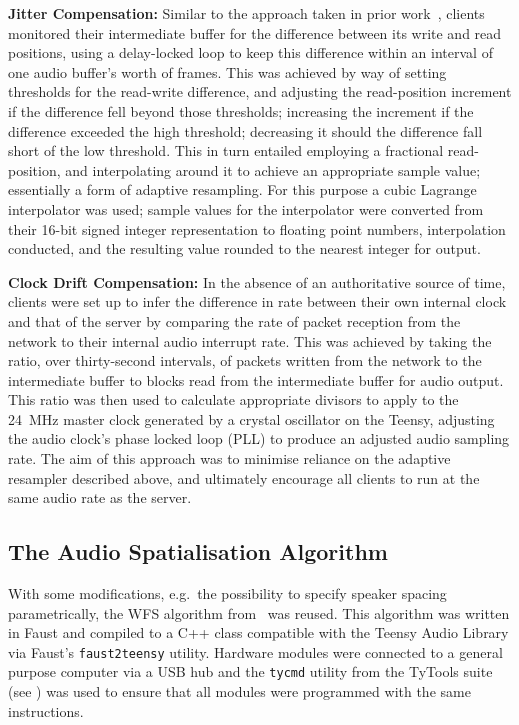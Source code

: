 \textbf{Jitter Compensation:}
Similar to the approach taken in prior
work~\citep{rushton_microcontroller-based_2023}, clients monitored their
intermediate buffer for the difference between its write and read positions,
using a delay-locked loop to keep this difference within an interval of
one audio buffer's worth of frames.
This was achieved by way of setting thresholds for the read-write difference,
and adjusting the read-position increment if the difference fell beyond those
thresholds;
increasing the increment if the difference exceeded the high threshold;
decreasing it should the difference fall short of the low threshold.
This in turn entailed employing a fractional read-position, and interpolating
around it to achieve an appropriate sample value; essentially a form of adaptive
resampling.
For this purpose a cubic Lagrange interpolator was used; sample values for the
interpolator were converted from their 16-bit signed integer representation
to floating point numbers, interpolation conducted, and the resulting value
rounded to the nearest integer for output.

\textbf{Clock Drift Compensation:}
In the absence of an authoritative source of time, clients were set up to infer
the difference in rate between their own internal clock and that of the server
by comparing the rate of packet reception from the network to their internal
audio interrupt rate.
This was achieved by taking the ratio, over thirty-second intervals, of
packets written from the network to the intermediate buffer to blocks read
from the intermediate buffer for audio output.
This ratio was then used to calculate appropriate divisors to apply to the
\qty{24}{\MHz} master clock generated by a crystal oscillator on the Teensy,
adjusting the audio clock's phase locked loop (PLL) to produce an adjusted audio
sampling rate.
The aim of this approach was to minimise reliance on the adaptive resampler
described above, and ultimately encourage all clients to run at the same audio
rate as the server.

\subsection{The Audio Spatialisation Algorithm}\label{subsec:wfs-algorithm}

With some modifications, e.g.\ the possibility to specify speaker spacing
parametrically, the WFS algorithm
from~\citep{rushton_microcontroller-based_2023} was reused.
This algorithm was written in Faust and compiled to
a C++ class compatible with the Teensy Audio Library via Faust's
\texttt{faust2teensy} utility.
Hardware modules were connected to a general purpose computer via a USB hub
and the \texttt{tycmd} utility from the TyTools suite (see
) was used to ensure that all modules were
programmed with the same instructions.

